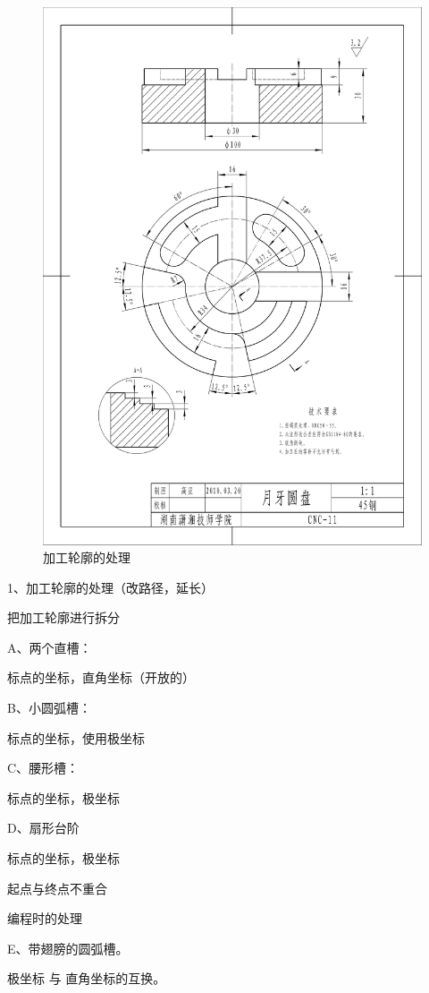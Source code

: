 \begin{figure}
	\centering
	\includegraphics[width=0.9\linewidth,trim=50 150 50  50,clip]{data/image/30-1}
	\caption{加工轮廓的处理}
	\label{fig:30-1}
\end{figure}

1、加工轮廓的处理（改路径，延长）

把加工轮廓进行拆分

A、两个直槽：

标点的坐标，直角坐标（开放的）

B、小圆弧槽：

标点的坐标，使用极坐标

C、腰形槽：

标点的坐标，极坐标

D、扇形台阶

标点的坐标，极坐标

起点与终点不重合

编程时的处理

E、带翅膀的圆弧槽。

极坐标 与 直角坐标的互换。

